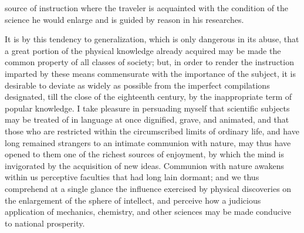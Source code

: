 source of instruction where the traveler is acquainted with the condition of the science he would enlarge and is guided by reason in his researches.

It is by this tendency to generalization, which is only dangerous in its abuse, that a great portion of the physical knowledge already acquired may be made the common property of all classes of society; but, in order to render the instruction imparted by these means commensurate with the importance of the subject, it is desirable to deviate as widely as possible from the imperfect compilations designated, till the close of the eighteenth century, by the inappropriate term of popular knowledge. I take pleasure in persuading myself that scientific subjects may be treated of in language at once dignified, grave, and animated, and that those who are restricted within the circumscribed limits of ordinary life, and have long remained strangers to an intimate communion with nature, may thus have opened to them one of the richest sources of enjoyment, by which the mind is invigorated by the acquisition of new ideas. Communion with nature awakens within us perceptive faculties that had long lain dormant; and we thus comprehend at a single glance the influence exercised by physical discoveries on the enlargement of the sphere of intellect, and perceive how a judicious application of mechanics, chemistry, and other sciences may be made conducive to national prosperity.

